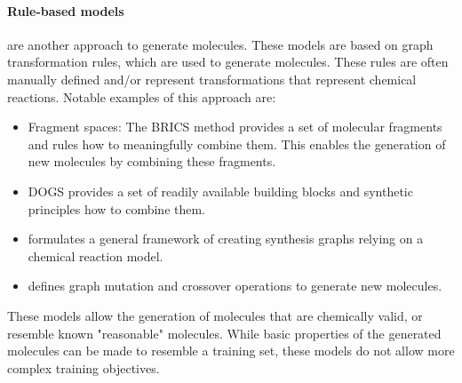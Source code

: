 \paragraph{Rule-based models} are another approach to generate molecules. These
models are based on graph transformation rules, which are used to generate
molecules. These rules are often manually defined and/or represent 
transformations that represent chemical reactions. 
Notable examples of this approach are: 

\begin{itemize}
    \item Fragment spaces: The BRICS \citep{degenArtCompilingUsing2008} method
    provides a set of molecular fragments and rules how to meaningfully combine
    them. This enables the generation of new molecules by combining these
    fragments.
    \item DOGS \citep{hartenfellerDOGSReactionDrivenNovo2012} provides a 
    set of readily available building blocks and synthetic principles how to 
    combine them. 
    \item \citep{bradshawBarkingRightTree2020,gottipatiLearningNavigateSynthetically2020} formulates a general framework 
    of creating synthesis graphs relying on a chemical reaction model.
    \item \citep{jensenGraphbasedGeneticAlgorithm2019} defines graph mutation 
    and crossover operations to generate new molecules. 
\end{itemize}
These models allow the generation of molecules that are chemically valid, 
or resemble known "reasonable" molecules. While basic properties of 
the generated molecules can be made to resemble a training set, 
these models do not allow more complex training objectives. 

